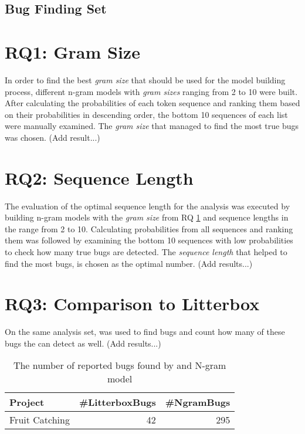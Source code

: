 \subsection{Bug Finding Set}\label{subsec:bugset}


\section{RQ1: Gram Size}\label{sec:gram_size}
In order to find the best \textit{gram size} that should be used for the model building process, different n-gram models with \textit{gram sizes} ranging from 2 to 10 were built. After calculating the probabilities of each token sequence and ranking them based on their probabilities in descending order, the bottom 10 sequences of each list were manually examined. The \textit{gram size} that managed to find the most true bugs was chosen. (Add result...)



\section{RQ2: Sequence Length}\label{sec:sequence_length}
The evaluation of the optimal sequence length for the analysis was executed by building n-gram models with the \textit{gram size} from RQ \ref{sec:gram_size} and {sequence lengths} in the range from 2 to 10. Calculating probabilities from all sequences and ranking them was followed by examining the bottom 10 sequences with low probabilities to check how many true bugs are detected. The \textit{sequence length} that helped to find the most bugs, is chosen as the optimal number. (Add results...)



\section{RQ3: Comparison to Litterbox}\label{sec:litterbox}
On the same analysis set, \litterbox{} was used to find bugs and count how many of these bugs the \ngram{} can detect as well. (Add results...)

\begin{table}[H]
    \centering
    \caption[The number of reported bugs found by \litterbox{} and N-gram model.]{\label{tab:aums-pupilset}The number of reported bugs found by \litterbox{} and N-gram model}
    \begin{tabular}{lrr}
        \toprule
        Project & \#LitterboxBugs & \#NgramBugs \\
        \midrule
        Fruit Catching & 42 & 295 \\
        \bottomrule
    \end{tabular}
\end{table}
 
